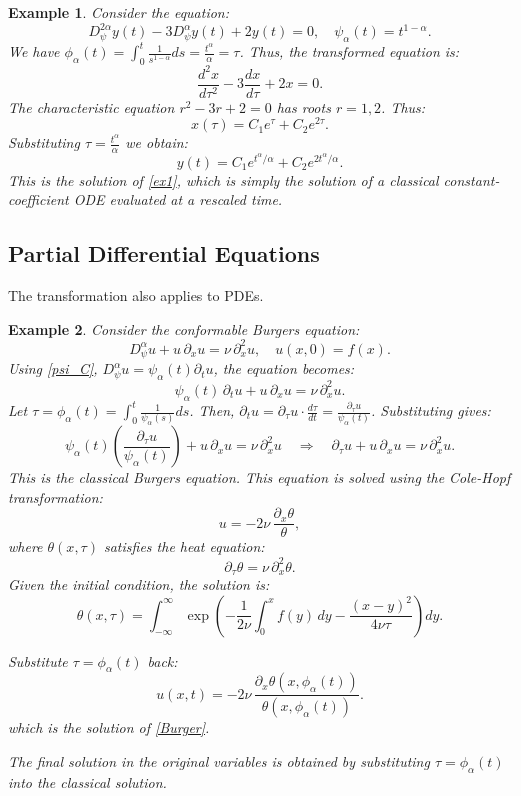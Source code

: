 \documentclass[preprint,12pt]{elsarticle}
\newtheorem{example}{Example}
\begin{document}
\begin{example} Consider the equation:
\begin{equation}\label{ex1}
D_\psi^{2\alpha} y(t) - 3 D_\psi^{\alpha} y(t) + 2y(t) = 0, \quad \psi_\alpha(t) = t^{1-\alpha}.
\end{equation}
We have $\phi_{\alpha}(t)=\int_{0}^{t}{\frac{1}{s^{1-\alpha}}ds}=\frac{t^\alpha}{\alpha}=\tau$.
Thus, the transformed equation is:
\[
\frac{d^2 x}{d\tau^2} - 3 \frac{dx}{d\tau} + 2x = 0.
\]
The characteristic equation \( r^2 - 3r + 2 = 0 \) has roots \( r = 1, 2 \). Thus:
\[
x(\tau) = C_1 e^{\tau} + C_2 e^{2\tau}.
\]
Substituting \( \tau = \frac{t^\alpha}{\alpha} \) we obtain:
\[
y(t) = C_1 e^{t^\alpha / \alpha} + C_2 e^{2 t^\alpha / \alpha}.
\]
This is the solution of \eqref{ex1}, which is simply the solution of a classical constant-coefficient ODE evaluated at a rescaled time.
\end{example}

\subsection{Partial Differential Equations}
The transformation also applies to PDEs.

\begin{example} Consider the conformable Burgers equation:
\begin{equation}\label{Burger}
D^{\alpha}_{\psi} u + u \, \partial_x u = \nu \, \partial_x^2 u,\quad u(x,0) = f(x).
\end{equation}
Using \eqref{psi_C}, $D^{\alpha}_{\psi} u = \psi_{\alpha}(t) \partial_t u$, the equation becomes:
\[
\psi_{\alpha}(t) \, \partial_t u + u \, \partial_x u = \nu \, \partial_x^2 u.
\]
Let \(\tau = \phi_{\alpha}(t) = \int_0^t \frac{1}{\psi_{\alpha}(s)} ds\). Then, \(\partial_t u = \partial_\tau u \cdot \frac{d\tau}{dt} = \frac{\partial_\tau u}{\psi_{\alpha}(t)}\). Substituting gives:
\[
\psi_{\alpha}(t) \left( \frac{\partial_\tau u}{\psi_{\alpha}(t)} \right) + u \, \partial_x u = \nu \, \partial_x^2 u \quad \Rightarrow \quad \partial_\tau u + u \, \partial_x u = \nu \, \partial_x^2 u.
\]
This is the classical Burgers equation. This equation is solved using the Cole-Hopf transformation:
\[
u = -2\nu \, \frac{\partial_x \theta}{\theta},
\]
where \(\theta(x,\tau)\) satisfies the heat equation:
\[
\partial_\tau \theta = \nu \, \partial_x^2 \theta.
\]
Given the initial condition, the solution is:
\[
\theta(x,\tau) = \int_{-\infty}^\infty \exp \left( -\frac{1}{2\nu} \int_0^x f(y) \, dy - \frac{(x-y)^2}{4\nu \tau} \right) dy.
\]

Substitute \(\tau = \phi_{\alpha}(t)\) back:
\[
u(x,t) = -2\nu \, \frac{\partial_x \theta \left( x, \phi_{\alpha}(t) \right)}{\theta \left( x, \phi_{\alpha}(t) \right)}.
\]
which is the solution of \eqref{Burger}.

 The final solution in the original variables is obtained by substituting \(\tau = \phi_{\alpha}(t)\) into the classical solution.
\end{example}
\end{document}
